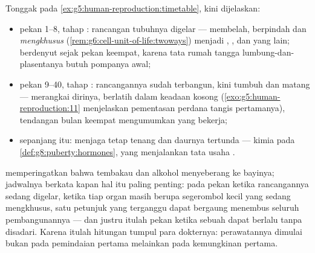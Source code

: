 \begin{proposition}\label{prop:g8:from-egg-to-birth:timetable}
Tonggak pada \cref{ex:g5:human-reproduction:timetable}, kini
dijelaskan:
\begin{itemize}
  \item pekan 1--8, tahap \emph{}: rancangan tubuhnya
        digelar ---  membelah, berpindah dan
        \emph{mengkhusus}
        (\cref{rem:g6:cell-unit-of-life:twoways}) menjadi
        , ,  dan yang lain; 
        berdenyut sejak pekan keempat, karena tata rumah
        tangga lumbung-dan-plasentanya butuh pompanya awal;
  \item pekan 9--40, tahap \emph{}: rancangannya sudah
        terbangun, kini tumbuh dan matang --- 
        merangkai dirinya,  berlatih dalam
        keadaan kosong (\cref{exo:g5:human-reproduction:11}
        menjelaskan pementasan perdana tangis pertamanya),
        tendangan bulan keempat mengumumkan  yang bekerja;
  \item sepanjang itu:  menjaga  tetap tenang
        dan daurnya tertunda --- kimia pada
        \cref{def:g8:puberty:hormones}, yang menjalankan
        tata usaha .
\end{itemize}
\end{proposition}
\admitted

\begin{example}\label{ex:g8:from-egg-to-birth:earlycare}
 memperingatkan bahwa
tembakau dan alkohol menyeberang ke bayinya; jadwalnya
berkata kapan hal itu paling penting: pada pekan 
ketika rancangannya sedang digelar, ketika tiap organ masih
berupa segerombol kecil  yang sedang mengkhusus, satu
petunjuk yang terganggu dapat bergaung menembus seluruh
pembangunannya --- dan justru itulah pekan ketika sebuah
 dapat berlalu tanpa disadari. Karena itulah
hitungan tumpul para dokternya: perawatannya dimulai bukan
pada pemindaian pertama melainkan pada kemungkinan pertama.
\end{example}

